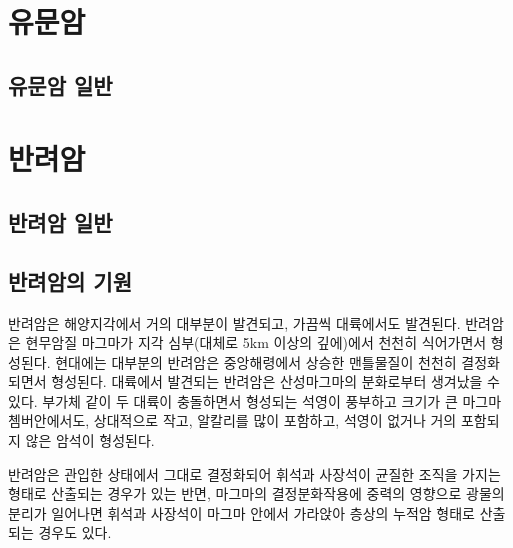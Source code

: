 \documentclass[12pt, a4paper, twoside]{book}
\begin{document}
	\clearpage
	\chapter{유문암}
	\minitoc				%

	\clearpage
	\section{유문암 일반}






	\clearpage
	\chapter{반려암}
	\minitoc				%


	\clearpage
	\section{반려암 일반}


	\section{반려암의 기원}
		반려암은 해양지각에서 거의 대부분이 발견되고, 가끔씩 대륙에서도 발견된다. 
		반려암은 현무암질 마그마가 지각 심부(대체로 5km 이상의 깊에)에서 천천히 식어가면서 형성된다. 
		현대에는 대부분의 반려암은 중앙해령에서 상승한 맨틀물질이 천천히 결정화되면서 형성된다. 
		대륙에서 발견되는 반려암은 산성마그마의 분화로부터 생겨났을 수 있다. 
		부가체 같이 두 대륙이 충돌하면서 형성되는 석영이 풍부하고 크기가 큰 마그마 쳄버안에서도, 상대적으로 작고, 알칼리를 많이 포함하고, 석영이 없거나 거의 포함되지 않은 암석이 형성된다.

		반려암은 관입한 상태에서 그대로 결정화되어 휘석과 사장석이 균질한 조직을 가지는 형태로 산출되는 경우가 있는 반면, 
		마그마의 결정분화작용에 중력의 영향으로 광물의 분리가 일어나면 휘석과 사장석이 마그마 안에서 가라앉아 층상의 누적암 형태로 산출되는 경우도 있다.
		
\end{document}
